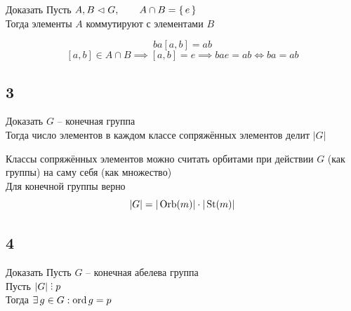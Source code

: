 \begin{undefthm}{Доказать}
    Пусть $ A, B \vartriangleleft G, \qquad A \cap B = \set{e} $ \\
    Тогда элементы $ A $ коммутируют с элементами $ B $
\end{undefthm}

$$ ba[a, b] = ab $$
$$ [a, b] \in A \cap B \implies [a, b] = e \implies bae = ab \iff ba = ab $$

\subsection{3}

\begin{undefthm}{Доказать}
	$ G $ -- конечная группа \\
    Тогда число элементов в каждом классе сопряжённых элементов делит $ |G| $
\end{undefthm}

Классы сопряжённых элементов можно считать орбитами при действии $ G $ (как группы) на саму себя (как множество) \\
Для конечной группы верно
$$ |G| = |\operatorname{Orb}(m)| \cdot |\operatorname{St}(m)| $$

\subsection{4}

\begin{undefthm}{Доказать}
	Пусть $ G $ -- конечная абелева группа \\
    Пусть $ |G| \divby p $ \\
    Тогда $ \exists\, g \in G : \operatorname{ord} g = p $
\end{undefthm}

